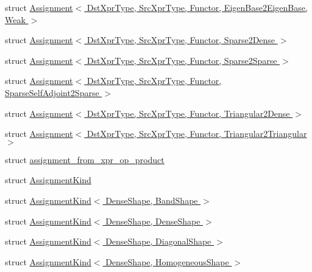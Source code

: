 \begin{DoxyCompactItemize}
\item 
struct \hyperlink{struct_eigen_1_1internal_1_1_assignment_3_01_dst_xpr_type_00_01_src_xpr_type_00_01_functor_00_018d07b9941c0091b62a0d03d702c7ac1b}{Assignment$<$ Dst\+Xpr\+Type, Src\+Xpr\+Type, Functor, Eigen\+Base2\+Eigen\+Base, Weak $>$}
\item 
struct \hyperlink{struct_eigen_1_1internal_1_1_assignment_3_01_dst_xpr_type_00_01_src_xpr_type_00_01_functor_00_01_sparse2_dense_01_4}{Assignment$<$ Dst\+Xpr\+Type, Src\+Xpr\+Type, Functor, Sparse2\+Dense $>$}
\item 
struct \hyperlink{struct_eigen_1_1internal_1_1_assignment_3_01_dst_xpr_type_00_01_src_xpr_type_00_01_functor_00_01_sparse2_sparse_01_4}{Assignment$<$ Dst\+Xpr\+Type, Src\+Xpr\+Type, Functor, Sparse2\+Sparse $>$}
\item 
struct \hyperlink{struct_eigen_1_1internal_1_1_assignment_3_01_dst_xpr_type_00_01_src_xpr_type_00_01_functor_00_017b35cf78061a31c93b838bddfa619fa3}{Assignment$<$ Dst\+Xpr\+Type, Src\+Xpr\+Type, Functor, Sparse\+Self\+Adjoint2\+Sparse $>$}
\item 
struct \hyperlink{struct_eigen_1_1internal_1_1_assignment_3_01_dst_xpr_type_00_01_src_xpr_type_00_01_functor_00_01_triangular2_dense_01_4}{Assignment$<$ Dst\+Xpr\+Type, Src\+Xpr\+Type, Functor, Triangular2\+Dense $>$}
\item 
struct \hyperlink{struct_eigen_1_1internal_1_1_assignment_3_01_dst_xpr_type_00_01_src_xpr_type_00_01_functor_00_01_triangular2_triangular_01_4}{Assignment$<$ Dst\+Xpr\+Type, Src\+Xpr\+Type, Functor, Triangular2\+Triangular $>$}
\item 
struct \hyperlink{struct_eigen_1_1internal_1_1assignment__from__xpr__op__product}{assignment\+\_\+from\+\_\+xpr\+\_\+op\+\_\+product}
\item 
struct \hyperlink{struct_eigen_1_1internal_1_1_assignment_kind}{Assignment\+Kind}
\item 
struct \hyperlink{struct_eigen_1_1internal_1_1_assignment_kind_3_01_dense_shape_00_01_band_shape_01_4}{Assignment\+Kind$<$ Dense\+Shape, Band\+Shape $>$}
\item 
struct \hyperlink{struct_eigen_1_1internal_1_1_assignment_kind_3_01_dense_shape_00_01_dense_shape_01_4}{Assignment\+Kind$<$ Dense\+Shape, Dense\+Shape $>$}
\item 
struct \hyperlink{struct_eigen_1_1internal_1_1_assignment_kind_3_01_dense_shape_00_01_diagonal_shape_01_4}{Assignment\+Kind$<$ Dense\+Shape, Diagonal\+Shape $>$}
\item 
struct \hyperlink{struct_eigen_1_1internal_1_1_assignment_kind_3_01_dense_shape_00_01_homogeneous_shape_01_4}{Assignment\+Kind$<$ Dense\+Shape, Homogeneous\+Shape $>$}

\end{DoxyCompactItemize}
